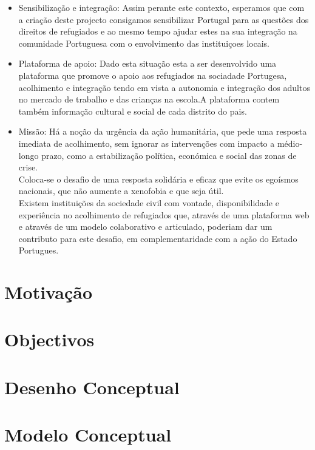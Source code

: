 \documentclass{article}
\begin{document}
\begin{itemize}
    \item Sensibilização e integração: Assim perante este contexto, esperamos que com a criação deste projecto consigamos sensibilizar Portugal para as questões dos direitos de refugiados e ao mesmo tempo ajudar estes na sua integração na comunidade Portuguesa com o envolvimento das instituiçoes locais.
    \item Plataforma de apoio: Dado esta situação esta a ser desenvolvido uma plataforma que promove o apoio aos refugiados na sociadade Portugesa, acolhimento e integração tendo em vista a autonomia e integração dos adultos no mercado de trabalho e das crianças na escola.A plataforma contem também informação cultural e social de cada distrito do pais. 
    \item Missão: Há a noção da urgência da ação humanitária, que pede uma resposta imediata de acolhimento, sem ignorar as intervenções com impacto a médio-longo prazo, como a estabilização política, económica e social das zonas de crise.\\Coloca-se o desafio de uma resposta  solidária e eficaz que evite os egoísmos nacionais, que não aumente a xenofobia e que seja útil.\\Existem instituições da sociedade civil com vontade, disponibilidade e experiência no acolhimento de refugiados que, através de uma plataforma web e através de um modelo colaborativo e articulado, poderiam dar um contributo para este desafio, em complementaridade com a ação do Estado Portugues. 


\end{itemize}

\section{Motivação}
\section{Objectivos}
\section{Desenho Conceptual}
\section{Modelo Conceptual}
\end{document}
